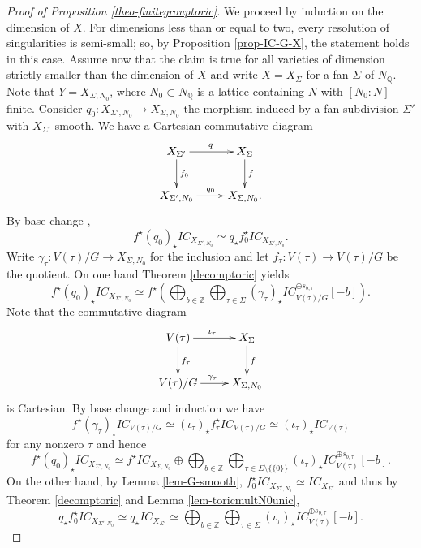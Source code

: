 \documentclass[11pt, reqno]{amsart}
\theoremstyle{plain}
\theoremstyle{definition}
\theoremstyle{remark}
\begin{document}
\begin{proof}[Proof of Proposition \ref{theo-finitegrouptoric}] We proceed by induction on  the dimension of $X$. 
For dimensions less than or equal to two, every resolution of singularities is semi-small; so, by Proposition \ref{prop-IC-G-X}, the statement holds in this case.
Assume now that the claim is true for all varieties of dimension strictly smaller than the dimension of 
$X$
and write $X  =  X_{\Sigma}$ for a fan $\Sigma$  of $N_{\mathbb{Q}}$. Note that $Y = X_{\Sigma, N_{0}}$, where $N_{0}\subset N_{\mathbb{Q}}$ is a lattice containing $N$
with $[N_{0}: N]$ finite. Consider $q_{0}: X_{\Sigma', N_{0}}\rightarrow X_{\Sigma, N_{0}}$
the morphism induced by a fan subdivision $\Sigma'$ with $X_{\Sigma'}$ smooth. We have a Cartesian commutative diagram
 $$\xymatrix{
      X_{\Sigma'}\ar[r]^{q} \ar[d] ^{f_{0}} & X_{\Sigma}\ar[d]^{f}\\ X_{\Sigma', N_{0}} \ar[r]^{q_{0}} & X_{\Sigma, N_{0}} .}$$ 
By base change \cite[Theorem 2.3.26]{Dim04},
$$ f^{\star}(q_{0})_{\star} IC_{X_{\Sigma', N_{0}}}\simeq q_{\star} f^{\star}_{0} IC_{X_{\Sigma', N_{0}}}.$$
Write $\gamma_{\tau}: V(\tau)/G\rightarrow X_{\Sigma, N_{0}}$ for the inclusion and let $f_{\tau}: V(\tau)\rightarrow V(\tau)/G$ be the quotient. On one hand Theorem \ref{decomptoric} yields 
$$ f^{\star}(q_{0})_{\star} IC_{X_{\Sigma', N_{0}}}\simeq f^{\star}\left( \bigoplus_{b\in \mathbb{Z}}\bigoplus_{\tau\in \Sigma}(\gamma_{\tau})_{\star}IC_{V(\tau)/G}^{\oplus s_{b, \tau}}[-b]\right).$$
Note that the commutative diagram 
 $$\xymatrix{
      V(\tau)\ar[r]^{\iota_{\tau}} \ar[d] ^{f_{\tau}} & X_{\Sigma}\ar[d]^{f}\\ V(\tau)/G \ar[r]^{\gamma_{\tau}} & X_{\Sigma, N_{0}} }$$ 
is Cartesian.
By base change and induction we have  
$$f^{\star} (\gamma_{\tau})_{\star} IC_{V(\tau)/G}\simeq (\iota_{\tau})_{\star}f_{\tau}^{\star}IC_{V(\tau)/G}\simeq (\iota_{\tau})_{\star} IC_{V(\tau)}$$
for any nonzero $\tau$ and hence
$$ f^{\star}(q_{0})_{\star} IC_{X_{\Sigma', N_{0}}}\simeq f^{\star} IC_{X_{\Sigma, N_{0}}}\oplus \bigoplus_{b\in\mathbb{Z}}\bigoplus_{\tau\in \Sigma\setminus \{\{0\}\}}(\iota_{\tau})_{\star}IC_{V(\tau)}^{\oplus s_{b, \tau}}[-b].$$
On the other hand, by Lemma \ref{lem-G-smooth},  $f_{0}^{\star} IC_{X_{\Sigma', N_{0}}}\simeq IC_{X_{\Sigma'}}$ and thus by Theorem \ref{decomptoric} and Lemma \ref{lem-toricmultN0unic},
\begin{equation}\label{Eq:qf}
    q_{\star} f_{0}^{\star} IC_{X_{\Sigma', N_{0}}}\simeq  q_{\star} IC_{X_{\Sigma'}}\simeq \bigoplus_{b\in \mathbb{Z}}\bigoplus_{\tau \in \Sigma}(\iota_{\tau})_{\star}IC_{V(\tau)}^{\oplus s_{b, \tau}}[-b].

\end{equation}
\end{proof}
\end{document}

